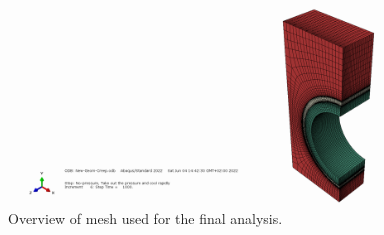\begin{figure}[h]
	\centering %
	\includegraphics[keepaspectratio, trim = 1050 12 150 30, clip, width=0.5\linewidth, height=0.3\textheight]{Images/monoblock-material-overview-mesh.png}
	\caption[Overview of  mesh used for the final analysis.]{Overview of  mesh used for the final analysis.}
	\label{fig:monoblock-overview-mesh}
\end{figure}

